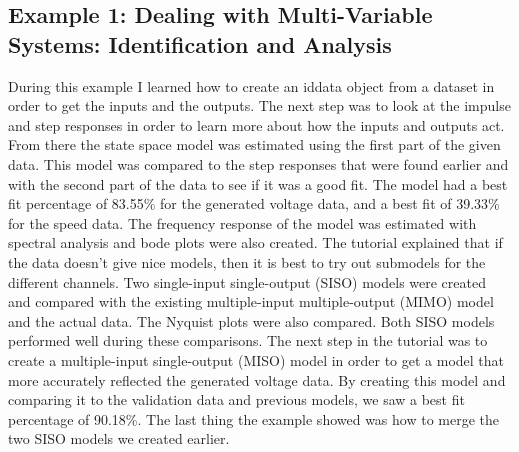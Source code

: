 \documentclass[letterpaper,12pt]{article}   %
\begin{document}
\subsection{Example 1: Dealing with Multi-Variable Systems: Identification and Analysis}
\label{sec:sysID-Example1}

During this example I learned how to create an iddata object from a dataset in order to get the inputs and the outputs. The next step was to look at the impulse and step responses in order to learn more about how the inputs and outputs act. From there the state space model was estimated using the first part of the given data. This model was compared to the step responses that were found earlier and with the second part of the data to see if it was a good fit. The model had a best fit percentage of 83.55\% for the generated voltage data, and a best fit of 39.33\% for the speed data. The frequency response of the model was estimated with spectral analysis and bode plots were also created. The tutorial explained that if the data doesn’t give nice models, then it is best to try out submodels for the different channels. Two single-input single-output (SISO) models were created and compared with the existing multiple-input multiple-output (MIMO) model and the actual data. The Nyquist plots were also compared. Both SISO models performed well during these comparisons. The next step in the tutorial was to create a multiple-input single-output (MISO) model in order to get a model that more accurately reflected the generated voltage data. By creating this model and comparing it to the validation data and previous models, we saw a best fit percentage of 90.18\%. The last thing the example showed was how to merge the two SISO models we created earlier.
\end{document}
